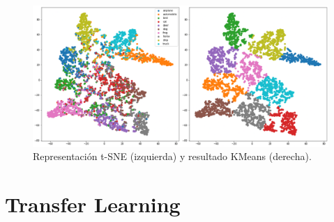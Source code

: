 \documentclass[11pt]{article}
\begin{document}
\begin{enumerate}
    \begin{figure}[H]
        \centering
        \includegraphics[scale = 0.4]{imgs/cifar.png}
        \caption{Representación t-SNE (izquierda) y resultado KMeans (derecha).}
        \label{fig:cifar_kmean}
    \end{figure}
    
\end{enumerate}
\section{Transfer Learning}
\end{document}
